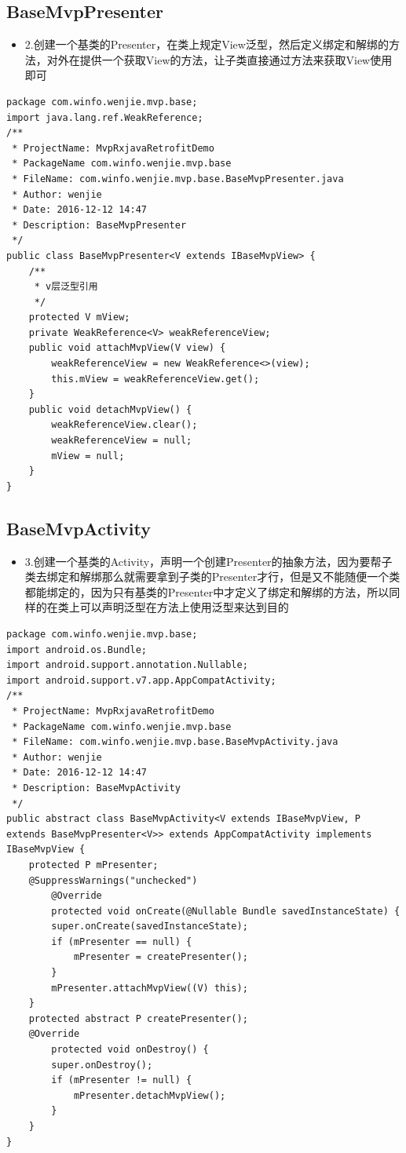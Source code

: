 \documentclass[9pt, b5paper]{article}
\begin{document}
\subsection{BaseMvpPresenter}
\label{sec-21-2}
\begin{itemize}
\item 2.创建一个基类的Presenter，在类上规定View泛型，然后定义绑定和解绑的方法，对外在提供一个获取View的方法，让子类直接通过方法来获取View使用即可
\end{itemize}
\begin{verbatim}
package com.winfo.wenjie.mvp.base;
import java.lang.ref.WeakReference;
/**
 * ProjectName: MvpRxjavaRetrofitDemo
 * PackageName com.winfo.wenjie.mvp.base
 * FileName: com.winfo.wenjie.mvp.base.BaseMvpPresenter.java
 * Author: wenjie
 * Date: 2016-12-12 14:47
 * Description: BaseMvpPresenter
 */
public class BaseMvpPresenter<V extends IBaseMvpView> {
    /**
     * v层泛型引用
     */
    protected V mView;
    private WeakReference<V> weakReferenceView;
    public void attachMvpView(V view) {
        weakReferenceView = new WeakReference<>(view);
        this.mView = weakReferenceView.get();
    }
    public void detachMvpView() {
        weakReferenceView.clear();
        weakReferenceView = null;
        mView = null;
    }
}
\end{verbatim}
\subsection{BaseMvpActivity}
\label{sec-21-3}
\begin{itemize}
\item 3.创建一个基类的Activity，声明一个创建Presenter的抽象方法，因为要帮子类去绑定和解绑那么就需要拿到子类的Presenter才行，但是又不能随便一个类都能绑定的，因为只有基类的Presenter中才定义了绑定和解绑的方法，所以同样的在类上可以声明泛型在方法上使用泛型来达到目的
\end{itemize}
\begin{verbatim}
package com.winfo.wenjie.mvp.base;
import android.os.Bundle;
import android.support.annotation.Nullable;
import android.support.v7.app.AppCompatActivity;
/**
 * ProjectName: MvpRxjavaRetrofitDemo
 * PackageName com.winfo.wenjie.mvp.base
 * FileName: com.winfo.wenjie.mvp.base.BaseMvpActivity.java
 * Author: wenjie
 * Date: 2016-12-12 14:47
 * Description: BaseMvpActivity
 */
public abstract class BaseMvpActivity<V extends IBaseMvpView, P extends BaseMvpPresenter<V>> extends AppCompatActivity implements IBaseMvpView {
    protected P mPresenter;
    @SuppressWarnings("unchecked")
        @Override
        protected void onCreate(@Nullable Bundle savedInstanceState) {
        super.onCreate(savedInstanceState);
        if (mPresenter == null) {
            mPresenter = createPresenter();
        }
        mPresenter.attachMvpView((V) this);
    }
    protected abstract P createPresenter();
    @Override
        protected void onDestroy() {
        super.onDestroy();
        if (mPresenter != null) {
            mPresenter.detachMvpView();
        }
    }
}
\end{verbatim}
\end{document}

